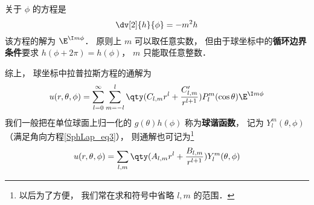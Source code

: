 关于 $\phi$ 的方程是
\begin{equation}
\dv[2]{h}{\phi} = -m^2 h
\end{equation}
该方程的解为 $\E^{\I m\phi}$． 原则上 $m$ 可以取任意实数， 但由于球坐标中的\textbf{循环边界条件}要求 $h(\phi + 2\pi) = h(\phi)$， $m$ 只能取任意整数．

综上， 球坐标中拉普拉斯方程的通解为
\begin{equation}
u(r, \theta, \phi) = \sum_{l = 0}^\infty \sum_{m = -l}^l \qty(C_{l,m} r^l + \frac{C'_{l,m}}{r^{l+1}})P_l^m(\cos\theta)\E^{\I m\phi}
\end{equation}
我们一般把在单位球面上归一化的 $g(\theta)h(\phi)$ 称为\textbf{球谐函数}， 记为 $Y_l^m(\theta,\phi)$ （满足角向方程\autoref{SphLap_eq3}）， 则通解也可记为\footnote{以后为了方便， 我们常在求和符号中省略 $l, m$ 的范围．}
\begin{equation}
u(r, \theta, \phi) = \sum_{l,m} \qty(A_{l,m} r^l + \frac{B_{l,m}}{r^{l+1}}) Y_l^m (\theta, \phi)
\end{equation}
